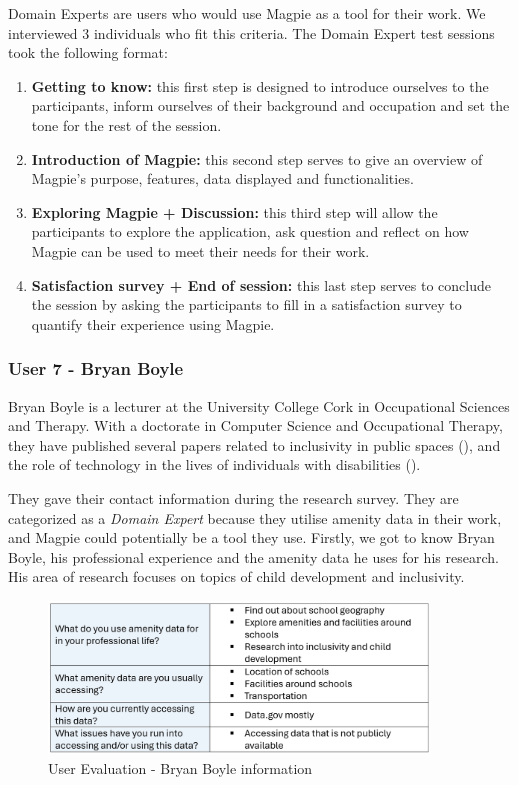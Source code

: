 Domain Experts are users who would use Magpie as a tool for their work. We
interviewed 3 individuals who fit this criteria. The Domain Expert test sessions
took the following format:
\begin{enumerate}
    \item \textbf{Getting to know:} this first step is designed to introduce ourselves to the participants, inform ourselves of their background and occupation and set the tone for the rest of the session.
    \item \textbf{Introduction of Magpie:} this second step serves to give an overview of Magpie's purpose, features, data displayed and functionalities.
    \item \textbf{Exploring Magpie + Discussion:} this third step will allow the participants to explore the application, ask question and reflect on how Magpie can be used to meet their needs for their work.
    \item \textbf{Satisfaction survey + End of session:} this last step serves to conclude the session by asking the participants to fill in a satisfaction survey to quantify their experience using Magpie.
\end{enumerate}

\subsubsection{User 7 - Bryan Boyle}
Bryan Boyle is a lecturer at the University College Cork in Occupational
Sciences and Therapy. With a doctorate in Computer Science and Occupational
Therapy, they have published several papers related to inclusivity in public
spaces (\cite{bryanboyleplaygroundinclusion2023}), and the role of technology in
the lives of individuals with disabilities
(\cite{bryanboylechildrenautism2022}).

They gave their contact information during the research survey. They are
categorized as a \emph{Domain Expert} because they utilise amenity data in their
work, and Magpie could potentially be a tool they use. Firstly, we got to know
Bryan Boyle, his professional experience and the amenity data he uses for his
research. His area of research focuses on topics of child development and
inclusivity.
\begin{figure}[h!]
    \centering
    \includegraphics[width=0.9\textwidth]{images/bryan-amenity-info.png}
    \caption{User Evaluation - Bryan Boyle information}
\end{figure}

